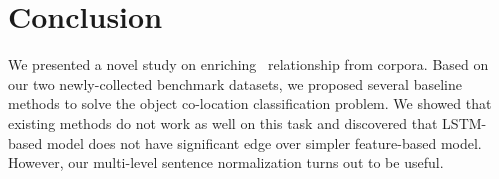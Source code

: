 \section{Conclusion}
We presented a novel study on enriching \lnear\ relationship from corpora. 
Based on our two newly-collected benchmark datasets, we proposed several baseline methods to solve 
the object co-location classification problem. 
We showed that existing methods do not work as well on this task and discovered that LSTM-based model does not have significant edge over 
simpler feature-based model. However, our multi-level sentence normalization turns out to be useful. 
